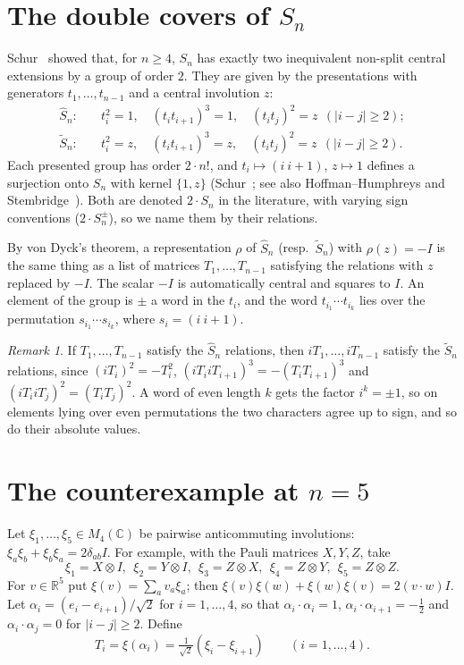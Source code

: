 \documentclass[11pt]{article}
\theoremstyle{remark}
\newtheorem{remark}[theorem]{Remark}
\newcommand{\Sh}{\widehat{S}}
\newcommand{\St}{\widetilde{S}}
\begin{document}
\section{The double covers of \texorpdfstring{$S_n$}{S\_n}}\label{sec:covers}
Schur~\cite{Schur} showed that, for $n\ge4$, $S_n$ has exactly two inequivalent non-split
central extensions by a group of order $2$. They are given by the
presentations with generators $t_1,\dots,t_{n-1}$ and a central involution $z$:
\begin{align*}
\Sh_n:&\quad t_i^2=1,\quad (t_it_{i+1})^3=1,\quad (t_it_j)^2=z\ \ (|i-j|\ge2);\\
\St_n:&\quad t_i^2=z,\quad (t_it_{i+1})^3=z,\quad (t_it_j)^2=z\ \ (|i-j|\ge2).
\end{align*}
Each presented group has order $2\cdot n!$, and $t_i\mapsto(i\ i{+}1)$, $z\mapsto1$ defines a
surjection onto $S_n$ with kernel $\{1,z\}$ (Schur~\cite{Schur}; see also Hoffman--Humphreys
\cite[Ch.~2]{HH} and Stembridge~\cite{Stembridge}). Both are denoted $2\cdot S_n$ in the
literature, with varying sign conventions ($2\cdot S_n^{\pm}$), so we name them by their
relations.

By von Dyck's theorem, a representation $\rho$ of $\Sh_n$ (resp.\ $\St_n$) with $\rho(z)=-I$ is
the same thing as a list of matrices $T_1,\dots,T_{n-1}$ satisfying the relations with $z$
replaced by $-I$. The scalar $-I$ is automatically central and squares to $I$. An element of the
group is $\pm$ a word in the $t_i$, and the word $t_{i_1}\cdots t_{i_k}$ lies over the permutation
$s_{i_1}\cdots s_{i_k}$, where $s_i=(i\ i{+}1)$.

\begin{remark}
If $T_1,\dots,T_{n-1}$ satisfy the $\Sh_n$ relations, then $iT_1,\dots,iT_{n-1}$ satisfy the
$\St_n$ relations, since $(iT_i)^2=-T_i^2$, $(iT_iiT_{i+1})^3=-(T_iT_{i+1})^3$ and
$(iT_iiT_j)^2=(T_iT_j)^2$. A word of even length $k$ gets the factor $i^k=\pm1$, so on elements
lying over even permutations the two characters agree up to sign, and so do their absolute
values.
\end{remark}

\section{The counterexample at \texorpdfstring{$n=5$}{n=5}}\label{sec:main}
Let $\xi_1,\dots,\xi_5\in M_4(\mathbb{C})$ be pairwise anticommuting involutions:
$\xi_a\xi_b+\xi_b\xi_a=2\delta_{ab}I$. For example, with the Pauli matrices
$X,Y,Z$, take
\[
\xi_1=X\otimes I,\ \ \xi_2=Y\otimes I,\ \ \xi_3=Z\otimes X,\ \ \xi_4=Z\otimes Y,\ \ \xi_5=Z\otimes Z .
\]
For $v\in\mathbb{R}^5$ put $\xi(v)=\sum_a v_a\xi_a$; then $\xi(v)\xi(w)+\xi(w)\xi(v)=2(v\cdot w)I$.
Let $\alpha_i=(e_i-e_{i+1})/\sqrt2$ for $i=1,\dots,4$, so that $\alpha_i\cdot\alpha_i=1$,
$\alpha_i\cdot\alpha_{i+1}=-\tfrac12$ and $\alpha_i\cdot\alpha_j=0$ for $|i-j|\ge2$. Define
\[
T_i=\xi(\alpha_i)=\tfrac1{\sqrt2}(\xi_i-\xi_{i+1})\qquad(i=1,\dots,4).
\]
\end{document}
